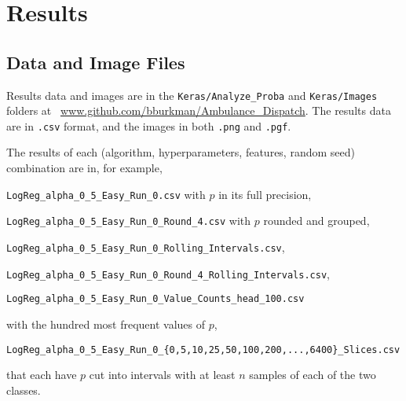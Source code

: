 \section{Results}\label{Results}

\subsection{Data and Image Files}
\label{data_files}

Results data and images are in the \verb|Keras/Analyze_Proba| and \verb|Keras/Images| folders at \
\url{www.github.com/bburkman/Ambulance_Dispatch}.  The results data are in \verb|.csv| format, and the images in both \verb|.png| and \verb|.pgf|.


\begin{comment}
The results in tables \ref{FP_P_0_05_Results}, \ref{Prec_0_667_Results}, and \ref{mProb_0_5_Results} are selections from the \
\verb|FP_P_0_05.csv|, \ 
\verb|Prec_0_667.csv|, and \
\verb|mProb_0_5.csv| files in the \ 
\verb|./Keras/Analyze_Proba| folder at \
\url{www.github.com/bburkman/Ambulance_Dispatch}.  
Each row of each of those three files represents a different combination of algorithm, hyperparameters, features, and run with different random seeds; for instance, the 
\verb|LogReg_alpha_0_5_Easy_Run_0| is the first run of the logistic regression algorithm with class weight $\alpha = 0.5$ on the Easy features.  

\end{comment}

The results of each (algorithm, hyperparameters, features, random seed) combination are in, for example, 


\qquad \verb|LogReg_alpha_0_5_Easy_Run_0.csv| with $p$ in its full precision,

\qquad \verb|LogReg_alpha_0_5_Easy_Run_0_Round_4.csv| with $p$ rounded and grouped,

\qquad \verb|LogReg_alpha_0_5_Easy_Run_0_Rolling_Intervals.csv|, 

\qquad \verb|LogReg_alpha_0_5_Easy_Run_0_Round_4_Rolling_Intervals.csv|, 

\qquad \verb|LogReg_alpha_0_5_Easy_Run_0_Value_Counts_head_100.csv|

\qquad \qquad  with the hundred most frequent values of $p$,

\qquad \verb|LogReg_alpha_0_5_Easy_Run_0_{0,5,10,25,50,100,200,...,6400}_Slices.csv| 

\qquad \qquad that each have $p$ cut into intervals with at least $n$ samples of each of the two classes.

